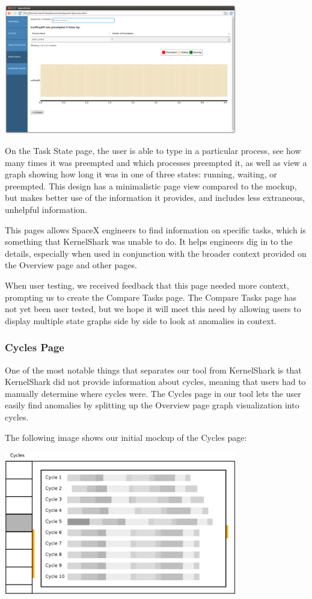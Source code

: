 \documentclass{hmcclinic}
\begin{document}
\begin{center}
\includegraphics[width=4in]{task-state-page.png}
\end{center}

On the Task State page, the user is able to type in a particular process, see
how many times it was preempted and which processes preempted it, as well as
view a graph showing how long it was in one of three states: running, waiting,
or preempted. This design has a minimalistic page view compared to the mockup,
but makes better use of the information it provides, and includes less
extraneous, unhelpful information.

This pages allows SpaceX engineers to find information on specific tasks, which
is something that KernelShark was unable to do. It helps engineers dig in to the
details, especially when used in conjunction with the broader context provided
on the Overview page and other pages.

When user testing, we received feedback that this page needed more context,
prompting us to create the Compare Tasks page. The Compare Tasks page has not
yet been user tested, but we hope it will meet this need by allowing users to
display multiple state graphs side by side to look at anomalies in context.

\subsubsection{Cycles Page}

One of the most notable things that separates our tool from KernelShark is that
KernelShark did not provide information about cycles, meaning that users had to
manually determine where cycles were.
The Cycles page in our tool lets the user easily find anomalies by splitting up
the Overview page graph visualization into cycles.

The following image shows our initial mockup of the Cycles page:

\begin{center}
\includegraphics[width=4in]{oldcycles.png}
\end{center}
\end{document}
